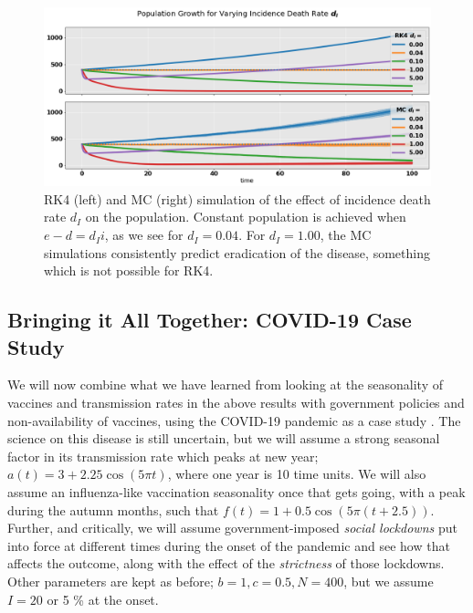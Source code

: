\documentclass[]{article}
\begin{document}
\begin{figure}[!h]
	\centering
	\includegraphics[width=1\linewidth]{./figs/dynamic-pop-pop-growth.png}
	\caption{RK4 (left) and MC (right) simulation of the effect of incidence death rate $d_I$ on the population. Constant population is achieved when $e-d=d_Ii$, as we see for $d_I=0.04$. For $d_I=1.00$, the MC simulations consistently predict eradication of the disease, something which is not possible for RK4.}
	\label{fig:dynamic-pop-pop-growth}
\end{figure}



\subsection{Bringing it All Together: COVID-19 Case Study} \label{sec:case-study}

We will now combine what we have learned from looking at the seasonality of vaccines and transmission rates in the above results with government policies and non-availability of vaccines, using the COVID-19 pandemic as a case study \cite{who-url}. The science on this disease is still uncertain, but we will assume a strong seasonal factor in its transmission rate which peaks at new year; $a(t) = 3 + 2.25 \cos (5\pi t) $, where one year is 10 time units. We will also assume an influenza-like vaccination seasonality once that gets going, with a peak during the autumn months, such that $f(t) = 1 + 0.5 \cos (5\pi (t+2.5))$. Further, and critically, we will assume government-imposed \textit{social lockdowns} put into force at different times during the onset of the pandemic and see how that affects the outcome, along with the effect of the \textit{strictness} of those lockdowns. Other parameters are kept as before; $b=1, c=0.5, N=400$, but we assume $I=20$ or 5 \% at the onset.
\end{document}
